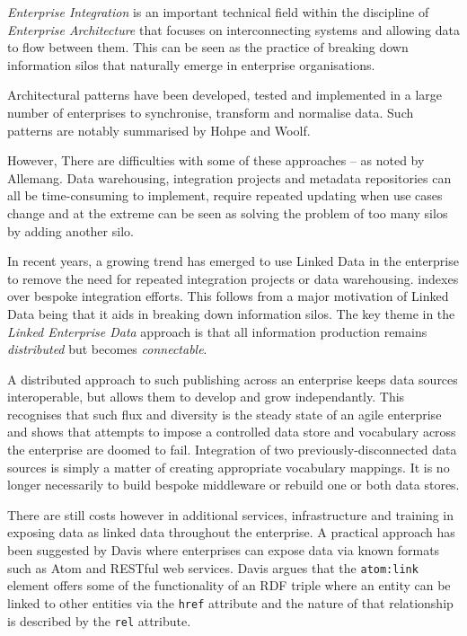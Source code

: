 \emph{Enterprise Integration} is an important technical field within the
discipline of \emph{Enterprise Architecture} that focuses on interconnecting
systems and allowing data to flow between them. This can be seen as
the practice of breaking down information silos that naturally emerge
in enterprise organisations.\cite{allemang2010semantic}

Architectural patterns have been developed, tested and
implemented in a large number of enterprises to synchronise,
transform and normalise data. Such patterns are notably
summarised by Hohpe and Woolf.\cite{hohpe2004enterprise}

However, There are difficulties with some of these approaches -- as noted by
Allemang\cite{allemang2010semantic}. Data warehousing,
integration projects and metadata repositories can all
be time-consuming to implement, require repeated updating when
use cases change and at the extreme can be seen as solving the
problem of too many silos by adding another silo.

In recent years, a growing trend has emerged to use
Linked Data in the enterprise to remove the need
for repeated integration projects or data warehousing.
indexes over bespoke integration efforts. This follows from
a major motivation of Linked Data being that it aids in breaking
down information silos.\cite{bizer2009linked} The key theme
in the \emph{Linked Enterprise Data} approach is that all information
production remains \emph{distributed} but becomes
\emph{connectable}.\cite{allemang2010semantic}

A distributed
approach to such publishing across an enterprise keeps data sources
interoperable, but allows them to develop and grow independantly. This
recognises that such flux and diversity is the steady state of
an agile enterprise and shows that attempts to impose a controlled
data store and vocabulary across the enterprise are doomed to fail.
Integration of two previously-disconnected data sources is simply
a matter of creating appropriate vocabulary mappings. It is no
longer necessarily to build bespoke middleware or rebuild one or
both data stores.

There are still costs however in additional services, infrastructure
and training in exposing data as linked data throughout the
enterprise.\cite{hyland2010preparing} A practical approach
has been suggested by Davis\cite{davis2011achieving} where enterprises
can expose data via known formats such as Atom\cite{nottingham2005atom}
and RESTful web services. Davis argues that the \texttt{atom:link}
element offers some of the functionality of an RDF triple where
an entity can be linked to other entities via the \texttt{href}
attribute and the nature of that relationship is described by
the \texttt{rel} attribute.

